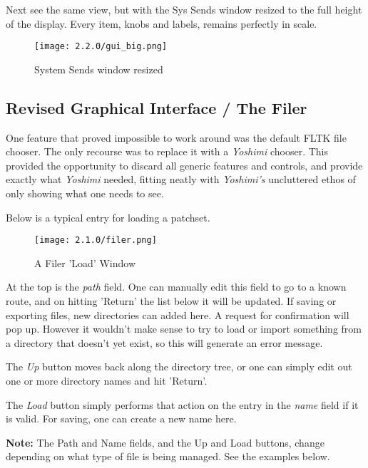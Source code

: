    Next see the same view, but with the Sys Sends window resized to the
   full height of the display. Every item, knobs and labels,
   remains perfectly in scale.

   \begin{figure}[H]
      \centering
      \texttt{[image: 2.2.0/gui\_big.png]}
      \caption{System Sends window resized}
      \label{fig:resized_sends_window}
   \end{figure}

\subsection{Revised Graphical Interface / The Filer}
\label{subsec:interface_filer}

   One feature that proved impossible to work around was the default FLTK file
   chooser. The only recourse was to replace it with a \textsl{Yoshimi}
   chooser.
   This provided the opportunity to discard all generic features and controls,
   and provide exactly what \textsl{Yoshimi} needed, fitting neatly with
   \textsl{Yoshimi's} uncluttered ethos of only showing what one needs to see.

   Below is a typical entry for loading a patchset.

   \begin{figure}[H]
      \centering
      \texttt{[image: 2.1.0/filer.png]}
      \caption{A Filer 'Load' Window}
      \label{fig:filer_load_window}
   \end{figure}

   At the top is the \textsl{path} field. One can manually edit this field to go
   to a known route, and on hitting 'Return' the list below it will be updated.
   If saving or exporting files, new directories can added here. A request for
   confirmation will pop up. However it wouldn't make sense to try to load or
   import something from a directory that doesn't yet exist, so this will
   generate an error message.

   The \textsl{Up} button moves back along the directory tree, or one can simply
   edit out one or more directory names and hit 'Return'.

   The \textsl{Load} button simply performs that action on the entry in the
   \textsl{name} field if it is valid. For saving, one can create a
   new name here.

    \textbf{Note:} The Path and Name fields, and the Up and Load buttons,
    change depending on what type of file is being managed. See the examples
    below.

